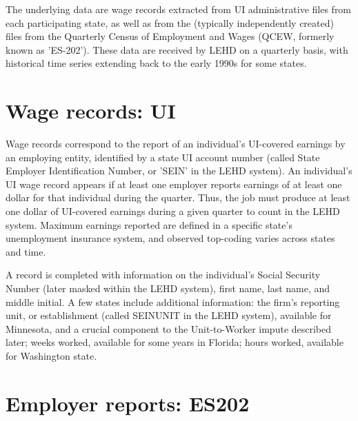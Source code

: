                       
%

The underlying data are wage records extracted from UI administrative files from each participating state, as
well as from the (typically independently created) files from the Quarterly
Census of Employment and Wages (QCEW, formerly known as 'ES-202'). These
data are received by LEHD on a quarterly basis, with historical time series
extending back to the early 1990s for some states. 


\section{Wage records: UI}
\label{sec:input_files:ui}

Wage records correspond to the report of an individual's
UI-covered earnings by an employing entity, identified by a state
UI account number (called State Employer Identification Number, or
'SEIN' in the LEHD system). An individual's {UI} wage record
appears if at least one employer reports earnings of at least one dollar
for that individual during the quarter. Thus, the job
must produce at least one dollar of {UI}-covered earnings during a given
quarter to count in the LEHD system. Maximum earnings reported are defined in a
specific state's unemployment insurance system, and observed top-coding
varies across states and time.

A record is completed with information on the individual's Social Security
Number (later masked within the LEHD system), first name, last name, and
middle initial. A few states include additional information: the firm's
reporting unit, or establishment (called SEINUNIT in the LEHD system),
available for Minnesota, and a crucial component to the Unit-to-Worker
impute described later; weeks worked, available for some years in Florida;
hours worked, available for Washington state.


\section{Employer reports: ES202}
\label{sec:input_files:es202}

